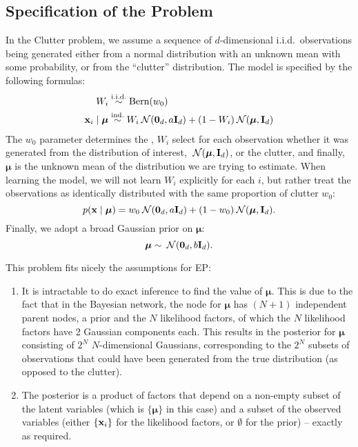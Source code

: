 \documentclass[11pt]{article}
\begin{document}
\subsection*{Specification of the Problem}
In the Clutter problem, we assume a sequence of $d$-dimensional i.i.d.\ 
observations being generated either from a normal distribution with an 
unknown mean with some probability, or from the ``clutter'' 
distribution. The model is specified by the following formulas:
\begin{align}
	W_i &\stackrel{\text{i.i.d.}}{\sim} \text{Bern}(w_0) \\
	\mathbf{x}_i\mid\boldsymbol{\mu} &\stackrel{\text{ind.}}{\sim} W_i \:\mathcal{N}(\mathbf{0}_d, a\mathbf{I}_{d}) + (1 - W_i) \:\mathcal{N}(\boldsymbol{\mu}, 
\mathbf{I}_{d})
\end{align}
The $w_0$ parameter determines the , $W_i$ 
select for each observation whether it was generated from the 
distribution of interest, $\:\mathcal{N}(\boldsymbol{\mu}, \mathbf{I}_{d})$, or the clutter, and 
finally, $\boldsymbol{\mu}$ is the unknown mean of the distribution we are trying to 
estimate. When learning the model, we will not learn $W_i$ explicitly 
for each $i$, but rather treat the observations as identically 
distributed with the same proportion of clutter $w_0$:
\begin{equation}
	p(\mathbf{x} \mid \boldsymbol{\mu}) = w_0 \:\mathcal{N}(\mathbf{0}_d, a \mathbf{I}_d) + (1 - w_0)\:\mathcal{N}(\boldsymbol{\mu}, 
	\mathbf{I}_d).
	\label{eq:cl-posterior}
\end{equation}
Finally, we adopt a broad Gaussian prior on $\boldsymbol{\mu}$:
\begin{equation}
	\boldsymbol{\mu} \sim \:\mathcal{N}(\mathbf{0}_d, b\mathbf{I}_{d}).
\end{equation}


This problem fits nicely the assumptions for EP:
\begin{enumerate}
	\item It is intractable to do exact inference to find the value of $\boldsymbol{\mu}$.  
		This is due to the fact that in the Bayesian network, the node for 
		$\boldsymbol{\mu}$ has $(N + 1)$ independent parent nodes, a prior and the $N$ 
		likelihood factors, of which the $N$ likelihood factors have 2 Gaussian 
		components each. This results in the posterior for $\boldsymbol{\mu}$ consisting of 
		$2^N$ $N$-dimensional Gaussians, corresponding to the $2^N$ subsets of 
		observations that could have been generated from the true distribution 
		(as opposed to the clutter).

	\item The posterior is a product of factors that depend on a non-empty 
		subset of the latent variables (which is $\{\boldsymbol{\mu}\}$ in this case) and 
		a subset of the observed variables (either $\{\mathbf{x}_i\}$ for the likelihood 
		factors, or $\emptyset$ for the prior) -- exactly as required.
\end{enumerate}
\end{document}
